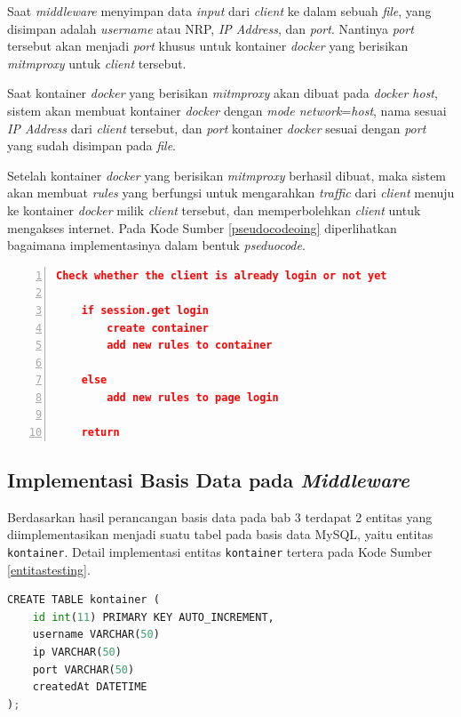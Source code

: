 Saat \textit{middleware} menyimpan data \textit{input} dari \textit{client} ke dalam sebuah \textit{file}, yang disimpan adalah \textit{username} atau NRP, \textit{IP Address}, dan \textit{port}. Nantinya \textit{port} tersebut akan menjadi \textit{port} khusus untuk kontainer \textit{docker} yang berisikan \textit{mitmproxy} untuk \textit{client} tersebut.

Saat kontainer \textit{docker} yang berisikan \textit{mitmproxy} akan dibuat pada \textit{docker host}, sistem akan membuat kontainer \textit{docker} dengan \textit{mode network}=\textit{host}, nama sesuai \textit{IP Address} dari \textit{client} tersebut, dan \textit{port} kontainer \textit{docker} sesuai dengan \textit{port} yang sudah disimpan pada \textit{file}.

Setelah kontainer \textit{docker} yang berisikan \textit{mitmproxy} berhasil dibuat, maka sistem akan membuat \textit{rules} yang berfungsi untuk mengarahkan \textit{traffic} dari \textit{client} menuju ke kontainer \textit{docker} milik \textit{client} tersebut, dan memperbolehkan \textit{client} untuk mengakses internet. Pada Kode Sumber \ref{pseudocodeoing} diperlihatkan bagaimana implementasinya dalam bentuk \textit{pseduocode}.
\newline

\begin{minipage}{\linewidth}  
	\begin{lstlisting}[numbers=left, frame=single,tabsize=2,breaklines,caption={Pseudocode Web Service},label=pseudocodeoing,language=json]
	Check whether the client is already login or not yet
	
	if session.get login
		create container
		add new rules to container
	
	else
		add new rules to page login
	
	return  	
	\end{lstlisting}
\end{minipage}

\subsection{Implementasi Basis Data pada \textit{Middleware}}
Berdasarkan hasil perancangan basis data pada bab 3 terdapat 2 entitas yang diimplementasikan menjadi suatu tabel pada basis data MySQL, yaitu entitas \texttt{kontainer}. Detail implementasi entitas \texttt{kontainer} tertera pada Kode Sumber \ref{entitastesting}.
\newline
\begin{lstlisting}[frame=single,tabsize=2,breaklines,captionpos=b,language=python, caption=\textit{Query} untuk membuat tabel testing,label=entitastesting]
CREATE TABLE kontainer (
	id int(11) PRIMARY KEY AUTO_INCREMENT,
	username VARCHAR(50)
	ip VARCHAR(50)
	port VARCHAR(50)
	createdAt DATETIME
);
\end{lstlisting}


